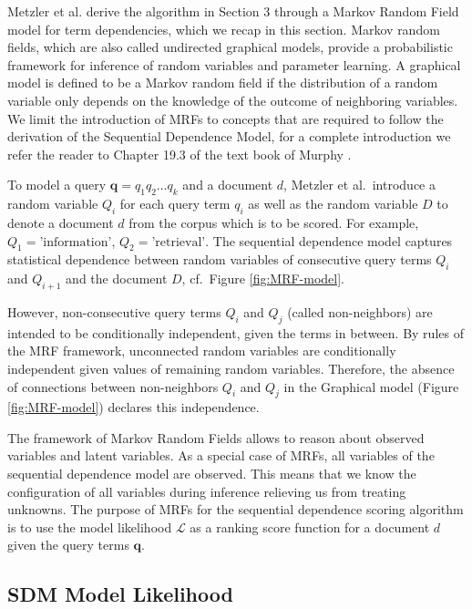 \documentclass[]{article}
\begin{document}
Metzler et al. derive the algorithm in Section 3 through a Markov
Random Field model for term dependencies, which we recap in this section.
Markov random fields, which are also called undirected graphical models,
provide a probabilistic framework for inference of random variables
and parameter learning. A graphical model is defined to be a Markov
random field if the distribution of a random variable only depends
on the knowledge of the outcome of neighboring variables. We limit
the introduction of MRFs to concepts that are required to follow the
derivation of the Sequential Dependence Model, for a complete introduction
we refer the reader to Chapter 19.3 of the text book of Murphy \cite{murphy2012book}. 

To model a query $\mathbf{q}=q_{1}q_{2}\ldots q_{k}$ and a document
$d$, Metzler et al.\ introduce a random variable $Q_{i}$ for each
query term $q_{i}$ as well as the random variable $D$ to denote
a document $d$ from the corpus which is to be scored. For example, $Q_{1}=\mbox{'information'}$, $Q_{2}=\mbox{'retrieval'}$.  The sequential
dependence model captures statistical dependence between random variables of consecutive
query terms $Q_{i}$ and $Q_{i+1}$ and the document $D$, cf.\ Figure
\ref{fig:MRF-model}. 

However, non-consecutive query terms $Q_{i}$ and $Q_{j}$ (called
non-neighbors) are intended to be conditionally independent, given
the terms in between. By rules of the MRF framework, unconnected random
variables are conditionally independent given values of remaining
random variables. Therefore, the absence of connections between non-neighbors
$Q_{i}$ and $Q_{j}$ in the Graphical model (Figure \ref{fig:MRF-model})
declares this independence.

The framework of Markov Random Fields allows to reason about observed
variables and latent variables. As a special case of MRFs, all variables of the
sequential dependence model are observed. This means that we know
the configuration of all variables during inference relieving us from
treating unknowns. The purpose of MRFs for the sequential dependence
scoring algorithm is to use the model likelihood $\mathcal{L}$ as
a ranking score function for a document $d$ given the query terms
$\mathbf{q}$.

\subsection{SDM Model Likelihood}
\end{document}
